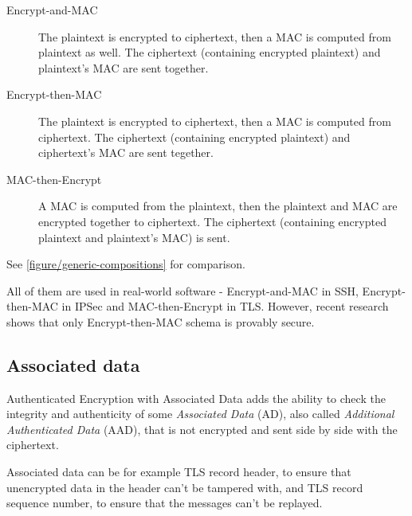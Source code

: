 \begin{description}
  \item[Encrypt-and-MAC] The plaintext is encrypted to ciphertext, then a MAC is computed from plaintext as well. The ciphertext (containing encrypted plaintext) and plaintext's MAC are sent together.
  \item[Encrypt-then-MAC] The plaintext is encrypted to ciphertext, then a MAC is computed from ciphertext. The ciphertext (containing encrypted plaintext) and ciphertext's MAC are sent tegether.
  \item[MAC-then-Encrypt] A MAC is computed from the plaintext, then the plaintext and MAC are encrypted together to ciphertext. The ciphertext (containing encrypted plaintext and plaintext's MAC) is sent.
\end{description}

See \autoref{figure/generic-compositions} for comparison.

All of them are used in real-world software - Encrypt-and-MAC in SSH, Encrypt-then-MAC in IPSec and MAC-then-Encrypt in TLS. However, recent research shows that only Encrypt-then-MAC schema is provably secure. \cite{generic-ae} \cite{generic-ae2}

\subsection{Associated data}

Authenticated Encryption with Associated Data adds the ability to check the integrity and authenticity of some \textit{Associated Data} (AD), also called \textit{Additional Authenticated Data} (AAD), that is not encrypted and sent side by side with the ciphertext.

Associated data can be for example TLS record header, to ensure that unencrypted data in the header can't be tampered with, and TLS record sequence number, to ensure that the messages can't be replayed.
